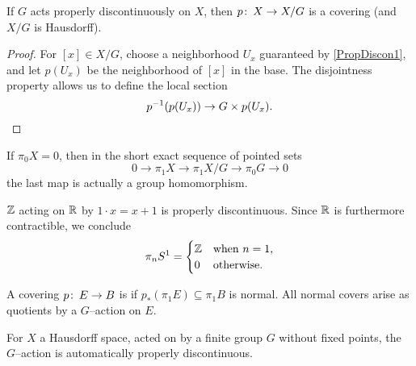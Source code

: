 \begin{lemma}
If $G$ acts properly discontinuously on $X$, then $p\colon\thinspace X \to X/G$ is a covering (and $X/G$ is Hausdorff).
\end{lemma}
\begin{proof}
For $[x] \in X/G$, choose a neighborhood $U_x$ guaranteed by \eqref{PropDiscon1}, and let $p(U_x)$ be the neighborhood of $[x]$ in the base.
The disjointness property allows us to define the local section \[p^{-1}(p(U_x)) \to G \times p(U_x). \qedhere\]
\end{proof}

\begin{remark}
If $\pi_0 X = 0$, then in the short exact sequence of pointed sets \[0 \to \pi_1 X \to \pi_1 X/G \to \pi_0 G \to 0\] the last map is actually a group homomorphism.
\end{remark}

\begin{example}\label{Pi1S1Calculation}
$\mathbb Z$ acting on $\mathbb R$ by $1 \cdot x = x+1$ is properly discontinuous.
Since $\mathbb R$ is furthermore contractible, we conclude \[\pi_n S^1 = \begin{cases} \mathbb Z & \text{when $n = 1$}, \\ 0 & \text{otherwise}. \end{cases}\]
\end{example}

\begin{remark}
A covering $p\colon\thinspace E \to B$ is  if $p_*(\pi_1 E) \subseteq \pi_1 B$ is normal.
All normal covers arise as quotients by a $G$--action on $E$.
\end{remark}

\begin{remark}
For $X$ a Hausdorff space, acted on by a finite group $G$ without fixed points, the $G$--action is automatically properly discontinuous.
\end{remark}





